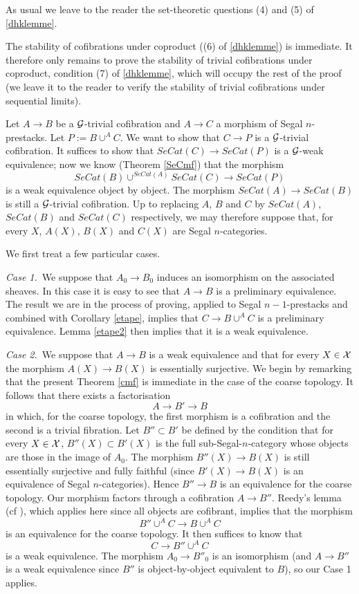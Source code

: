 As usual we leave to the reader the set-theoretic questions
(4) and (5) of \ref{dhklemme}.


The stability of cofibrations under
coproduct ((6) of \ref{dhklemme}) is immediate.
It therefore only remains to prove the stability of trivial cofibrations
under coproduct, condition (7) of \ref{dhklemme}, which will occupy the rest of the
proof (we leave it to the reader to verify the stability of
trivial cofibrations under sequential limits).

Let $A\rightarrow B$ be a ${\cal G}$-trivial cofibration
and $A\rightarrow C$ a morphism of
Segal $n$-prestacks. Let $P:= B\cup ^AC$. We want to show that
$C\rightarrow P$ is a ${\cal G}$-trivial cofibration. It suffices to show
that $SeCat(C)\rightarrow SeCat(P)$ is a ${\cal G}$-weak equivalence; now we
know (Theorem \ref{SeCmf}) that the morphism
$$
SeCat(B)\cup ^{SeCat(A)}SeCat(C) \rightarrow SeCat(P)
$$
is a weak equivalence object by object. The morphism $SeCat(A)\rightarrow
SeCat(B)$ is still a ${\cal G}$-trivial cofibration. Up to replacing
$A$, $B$ and $C$ by $SeCat(A)$, $SeCat(B)$ and $SeCat(C)$ respectively, we may
therefore suppose that, for every $X$, $A(X)$, $B(X)$ and $C(X)$ are
Segal
$n$-categories.

We first treat a few particular cases.

\noindent
{\em Case 1.}\, We suppose that $A_0\rightarrow B_0$ induces an isomorphism
on the
associated sheaves. In this case it is easy to see that $A\rightarrow
B$ is
a preliminary equivalence. The result we are in the process of
proving,
applied to Segal $n-1$-prestacks and combined with Corollary
\ref{etape},
implies that $C\rightarrow B\cup ^AC$ is a preliminary equivalence.
Lemma \ref{etape2} then implies that it is a weak equivalence.


\noindent
{\em Case 2.}\, We suppose that $A\rightarrow B$ is a weak
equivalence and that for every
$X\in {\cal X}$ the morphism $A(X)\rightarrow B(X)$ is essentially
surjective.
We begin by remarking that the present Theorem \ref{cmf} is
immediate
in the case of the coarse
topology.
It follows that there exists a factorisation
$$
A\rightarrow B' \rightarrow B
$$
in which, for the coarse topology,
the first morphism is a cofibration and the second
is a trivial fibration.
Let $B'' \subset B'$ be defined by the condition that for every
$X\in {\cal X}$, $B''(X) \subset B'(X)$ is the full sub-Segal-$n$-category
whose objects are those in the image of $A_0$. The morphism
$B'' (X)\rightarrow B(X)$ is still essentially surjective and
fully faithful (since $B'(X)\rightarrow B(X)$ is an
equivalence of Segal $n$-categories). Hence $B'' \rightarrow B$ is
an equivalence for the coarse topology.
Our morphism factors
through a cofibration $A\rightarrow B''$.
Reedy's lemma \cite{Reedy}
(cf \cite{Hirschhorn} \cite{DHK} \cite{HoveyBook} \cite{JardineGoerssBook}),
which applies here since all objects are cofibrant, implies that the
morphism
$$
B'' \cup ^A C \rightarrow B\cup ^AC
$$
is an equivalence for the coarse topology. It then suffices to know
that
$$
C \rightarrow B'' \cup ^A C
$$
is a weak equivalence. The morphism $A_0\rightarrow B''_0$ is an
isomorphism (and $A\rightarrow B''$ is a weak equivalence since $B''$ is
object-by-object equivalent to $B$), so our Case 1 applies.

